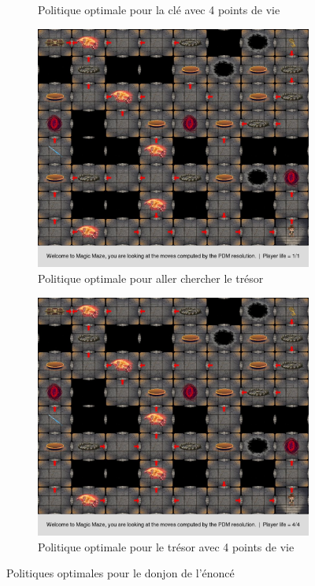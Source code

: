 \documentclass[a4paper]{article}
\theoremstyle{plain}
\begin{document}
\begin{figure}
\begin{subfigure}[b]{0.48\textwidth}
		\caption{Politique optimale pour la clé avec 4 points de vie}
		\label{fig:dclé4}
	\end{subfigure}
	\begin{subfigure}[b]{0.48\textwidth}
		\includegraphics[width=\textwidth]{dungeonSujet_solKey.jpeg}
		\caption{Politique optimale pour aller chercher le trésor}
	\end{subfigure}
	\begin{subfigure}[b]{0.48\textwidth}
		\includegraphics[width=\textwidth]{dungeonSujet_solKey_life4.jpeg}
		\caption{Politique optimale pour le trésor avec 4 points de vie}
	\end{subfigure}
	\caption{Politiques optimales pour le donjon de l'énoncé}
	\label{fig:donjonSujet}
\end{figure}
\end{document}
